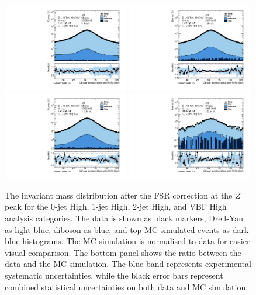 \begin{figure}[h!]
  \centering
  \includegraphics[width=0.49\textwidth]{figures/hmumu/reso/0jet_1}
  \includegraphics[width=0.49\textwidth]{figures/hmumu/reso/1jet_1}
  \includegraphics[width=0.49\textwidth]{figures/hmumu/reso/2jet_4}
  \includegraphics[width=0.49\textwidth]{figures/hmumu/reso/2jet_1}
  \caption[Mass resolution validation in analysis categories]{
  The invariant mass distribution after the FSR correction at the $Z$ peak
  for the 0-jet High, 1-jet High, 2-jet High, and VBF High
  analysis categories. The data is shown as black markers,
  Drell-Yan as light blue, diboson as blue, and top MC simulated events as
  dark blue histograms. The MC simulation is normalised to data
  for easier visual comparison. The bottom panel shows the ratio between the data and
  the MC simulation. The blue band represents experimental systematic
  uncertainties, while the black error bars represent combined
  statistical uncertainties on both data and MC simulation.
  }
  \label{fig:hmumu:reso}
\end{figure}

